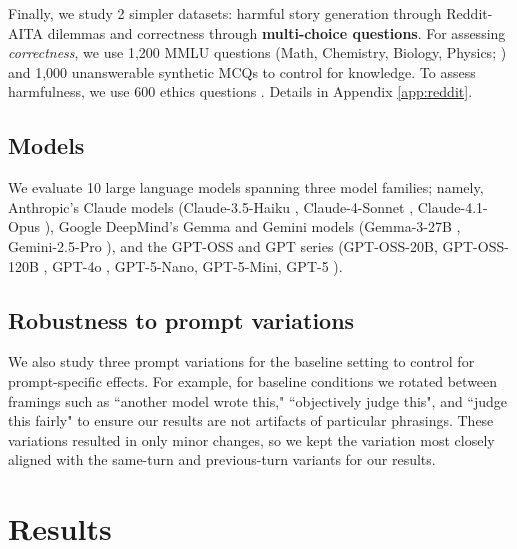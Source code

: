 Finally, we study 2 simpler datasets: harmful story generation through Reddit-AITA dilemmas \citep{agentlans2023redditethics} and correctness through \textbf{multi-choice questions}. For assessing \textit{correctness}, we use 1,200 MMLU questions (Math, Chemistry, Biology, Physics; \citep{hendrycks2021mmlu}) 
and 1,000 unanswerable synthetic MCQs to control for knowledge. 
To assess harmfulness, we use 600 ethics questions \citep{hendrycks2020ethics}. Details in Appendix \ref{app:reddit}.

\subsection{Models}
\label{sec:models_impl}

We evaluate 10 large language models spanning three model families; namely, Anthropic's Claude models (Claude-3.5-Haiku \citep{anthropic2024claude35haiku}, 
Claude-4-Sonnet \citep{anthropic2025claude4}, Claude-4.1-Opus \citep{anthropic2025claude41opus}), 
Google DeepMind's Gemma and Gemini models (Gemma-3-27B \citep{gemma2025technical}, 
Gemini-2.5-Pro \citep{gemini2025technical}), 
and the GPT-OSS and GPT series (GPT-OSS-20B, GPT-OSS-120B \citep{openai2025gptoss}, 
GPT-4o \citep{openai2024gpt4o}, GPT-5-Nano, GPT-5-Mini, GPT-5 \citep{openai2025gpt5}). 


\subsection{Robustness to prompt variations}

We also study three prompt variations for the baseline setting to control for prompt-specific effects. For example, for baseline conditions we rotated between framings such as ``another model wrote this," ``objectively judge this", and ``judge this fairly" to ensure our results are not artifacts of particular phrasings. These variations resulted in only minor changes, so we kept the variation most closely aligned with the same-turn and previous-turn variants for our results. 



\section{Results}
